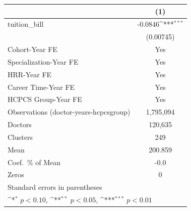 {
\def\sym#1{\ifmmode^{#1}\else\(^{#1}\)\fi}
\begin{tabular}{l*{1}{c}}
\hline\hline
                    &\multicolumn{1}{c}{(1)}         \\
\hline
tuition\_bill        &     -0.0846\sym{***}\\
                    &   (0.00745)         \\
[1em]
Cohort-Year FE      &         Yes         \\
[1em]
Specialization-Year FE&         Yes         \\
[1em]
HRR-Year FE         &         Yes         \\
[1em]
Career Time-Year FE &         Yes         \\
[1em]
HCPCS Group-Year FE &         Yes         \\
\hline
Observations (doctor-years-hcpcsgroup)&   1,795,094         \\
Doctors             &     120,635         \\
Clusters            &         249         \\
Mean                &     200.859         \\
Coef.\ \% of Mean   &        -0.0         \\
Zeros               &           0         \\
\hline\hline
\multicolumn{2}{l}{\footnotesize Standard errors in parentheses}\\
\multicolumn{2}{l}{\footnotesize \sym{*} \(p<0.10\), \sym{**} \(p<0.05\), \sym{***} \(p<0.01\)}\\
\end{tabular}
}
